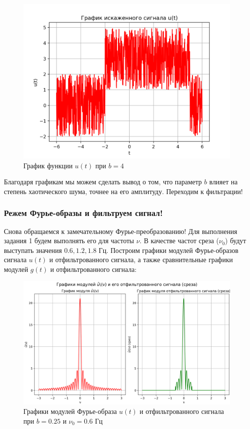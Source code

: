 \begin{figure}[ht!]
    \centering
    \includegraphics[scale=0.75]{media/1 task/high_freq/Noisy_4.png}
    \caption{График функции $u(t)$ при $b=4$}
    \label{fig:noisy_4}
\end{figure}

Благодаря графикам мы можем сделать вывод о том, что параметр $b$ влияет на степень хаотического шума, точнее на его амплитуду. Переходим к фильтрации!
\subsubsection{Режем Фурье-образы и фильтруем сигнал!}
 
Снова обращаемся к замечательному Фурье-преобразованию! Для выполнения задания 1 будем выполнять его для частоты $\nu$. В качестве частот среза ($\nu_0$) будут выступать значения $0.6, 1.2, 1.8$ Гц. Построим графики модулей Фурье-образов сигнала $u(t)$ и отфильтрованного сигнала, а также сравнительные графики модулей $g(t)$ и отфильтрованного сигнала:

\begin{figure}[ht!]
    \centering
    \includegraphics[scale=0.55]{media/1 task/high_freq/Fourier_Image_0,25_-0,5975975975975976.png}
    \caption{Графики модулей Фурье-образа $u(t)$ и отфильтрованного сигнала при $b=0.25$ и $\nu_0=0.6$ Гц}
    \label{fig:four_025_06}
\end{figure}

